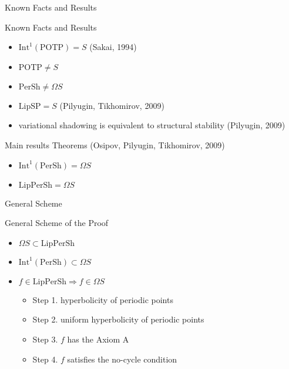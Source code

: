 \documentclass{beamer}
\begin{document}
\begin{section}{Known Facts and Results}
\begin{frame}{Known Facts and Results}
\begin{itemize}
	\item $\mbox{Int}^1(\mbox{POTP})=S$ (Sakai, 1994)
	\item $\mbox{POTP}\neq S$
	\item $\mbox{PerSh}\neq \Omega S$
	\item $\mbox{LipSP}=S$ (Pilyugin, Tikhomirov, 2009)
	\item variational shadowing is equivalent to structural stability (Pilyugin, 2009)
\end{itemize}
\begin{block}{Main results}
Theorems (Osipov, Pilyugin, Tikhomirov, 2009)

\begin{itemize}
	\item $\mbox{Int}^1(\mbox{PerSh})=\Omega S$
	\item $\mbox{LipPerSh}=\Omega S$
\end{itemize}
\end{block}
\end{frame}
\end{section}
\begin{section}{General Scheme}
\begin{frame}{General Scheme of the Proof}
\begin{itemize}
	\item $\Omega S\subset \mbox{LipPerSh}$
	\item $\mbox{Int}^1(\mbox{PerSh})\subset\Omega S$
	\item $f\in\mbox{LipPerSh}\Rightarrow f\in\Omega S$
\begin{itemize}
	\item Step 1. hyperbolicity of periodic points
	\item Step 2. uniform hyperbolicity of periodic points
	\item Step 3. $f$ has the Axiom A
	\item Step 4. $f$ satisfies the no-cycle condition
\end{itemize}
\end{itemize}
\end{frame}
\end{section}
\end{document}
